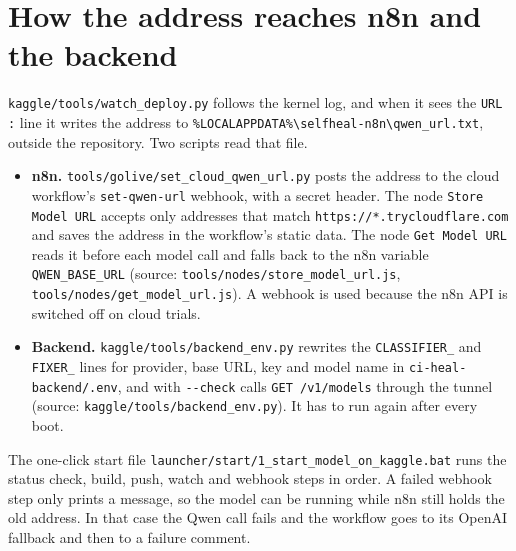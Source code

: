 \section{How the address reaches n8n and the backend}

\texttt{kaggle/\allowbreak{}tools/\allowbreak{}watch\_\allowbreak{}deploy.\allowbreak{}py} follows the kernel log, and when it sees the \texttt{URL :\allowbreak{}} line it writes the address to \texttt{\%LOCALAPPDATA\%\textbackslash{}selfheal-\allowbreak{}n8n\textbackslash{}qwen\_\allowbreak{}url.\allowbreak{}txt}, outside the repository. Two scripts read that file.

\begin{itemize}[leftmargin=*, itemsep=2pt]
\item \textbf{n8n.} \texttt{tools/\allowbreak{}golive/\allowbreak{}set\_\allowbreak{}cloud\_\allowbreak{}qwen\_\allowbreak{}url.\allowbreak{}py} posts the address to the cloud workflow's \texttt{set-\allowbreak{}qwen-\allowbreak{}url} webhook, with a secret header. The node \texttt{Store Model URL} accepts only addresses that match \texttt{https:\allowbreak{}/\allowbreak{}/\allowbreak{}*.\allowbreak{}trycloudflare.\allowbreak{}com} and saves the address in the workflow's static data. The node \texttt{Get Model URL} reads it before each model call and falls back to the n8n variable \texttt{QWEN\_\allowbreak{}BASE\_\allowbreak{}URL} (source: \texttt{tools/\allowbreak{}nodes/\allowbreak{}store\_\allowbreak{}model\_\allowbreak{}url.\allowbreak{}js}, \texttt{tools/\allowbreak{}nodes/\allowbreak{}get\_\allowbreak{}model\_\allowbreak{}url.\allowbreak{}js}). A webhook is used because the n8n API is switched off on cloud trials.
\item \textbf{Backend.} \texttt{kaggle/\allowbreak{}tools/\allowbreak{}backend\_\allowbreak{}env.\allowbreak{}py} rewrites the \texttt{CLASSIFIER\_\allowbreak{}} and \texttt{FIXER\_\allowbreak{}} lines for provider, base URL, key and model name in \texttt{ci-\allowbreak{}heal-\allowbreak{}backend/\allowbreak{}.\allowbreak{}env}, and with \texttt{-\allowbreak{}-\allowbreak{}check} calls \texttt{GET /\allowbreak{}v1/\allowbreak{}models} through the tunnel (source: \texttt{kaggle/\allowbreak{}tools/\allowbreak{}backend\_\allowbreak{}env.\allowbreak{}py}). It has to run again after every boot.
\end{itemize}

The one-click start file \texttt{launcher/\allowbreak{}start/\allowbreak{}1\_\allowbreak{}start\_\allowbreak{}model\_\allowbreak{}on\_\allowbreak{}kaggle.\allowbreak{}bat} runs the status check, build, push, watch and webhook steps in order. A failed webhook step only prints a message, so the model can be running while n8n still holds the old address. In that case the Qwen call fails and the workflow goes to its OpenAI fallback and then to a failure comment.


